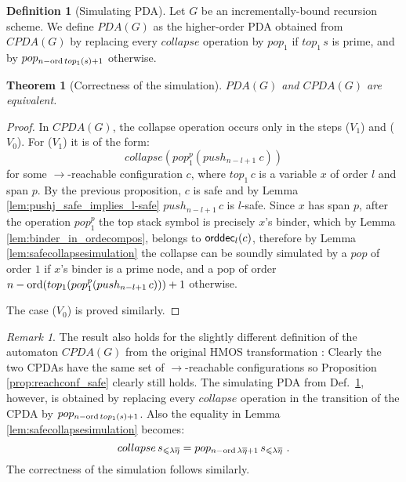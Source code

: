 \documentclass[a4paper]{article}[12pt]
\newtheorem{theorem}{Theorem}[section]
\theoremstyle{remark}
\newtheorem{remark}{Remark}[section]
\theoremstyle{definition}
\newtheorem{definition}{Definition}[section]
\newcommand\orddec{{\sf orddec}}
\begin{document}
\begin{definition}[Simulating PDA]
\label{simulating_pda}
Let $G$ be an incrementally-bound recursion scheme.
We define $PDA(G)$ as the higher-order PDA obtained from
$CPDA(G)$ by replacing every $collapse$ operation by $pop_1$ if $top_1\, s$ is prime, and by $pop_{n-\mathop{\mathrm{ord}}{top_1(s)}+1}$ otherwise.
\end{definition}


\begin{theorem}[Correctness of the simulation]
\label{thm:correctness_simulation}
$PDA(G)$ and $CPDA(G)$ are equivalent.
\end{theorem}
\begin{proof}
In $CPDA(G)$, the collapse operation occurs only in the steps ($V_1$) and ($V_0$). For ($V_1$) it is of the form:
$$collapse(pop_1^p(push_{n-l+1}~c))$$
for some $\rightarrow$-reachable configuration $c$, where $top_1\,c$ is a variable $x$ of order $l$ and span $p$.
By the previous proposition, $c$ is safe and by Lemma \ref{lem:pushj_safe_implies_l-safe} $push_{n-l+1}\, c$ is $l$-safe. Since $x$ has span $p$, after the operation $pop_1^p$ the top stack symbol is precisely $x$'s binder, which by Lemma \ref{lem:binder_in_ordecompos}, belongs to $\orddec_l(c)$, therefore
by Lemma \ref{lem:safecollapsesimulation} the collapse can be soundly simulated by a $pop$ of order
$1$ if $x$'s binder is a prime node, and a pop of order $n-\mathop{\mathrm{ord}}(top_1(pop_1^p(push_{n-l+1}\,c))) +1$ otherwise.

The case ($V_0$) is proved similarly.
\end{proof}

\begin{remark}
The result also holds for the slightly different definition of the automaton $CPDA(G)$ from the original HMOS transformation \cite{hmos-lics08}:
Clearly the two CPDAs have the same set of $\rightarrow$-reachable configurations
so Proposition \ref{prop:reachconf_safe} clearly still holds.
The simulating PDA from Def.\ \ref{simulating_pda}, however, is obtained 
by replacing every $collapse$ operation in the transition of the CPDA by $pop_{n-\mathop{\mathrm{ord}}{top_1(s)}+1}$. Also the equality in Lemma \ref{lem:safecollapsesimulation} becomes:
$$collapse\,s_{\leqslant\lambda\overline\eta} = pop_{n-\mathop{\mathrm{ord}} \lambda\overline\eta +1}\,s_{\leqslant\lambda\overline\eta} \ .$$
The correctness of the simulation follows similarly.
\end{remark}
\end{document}

